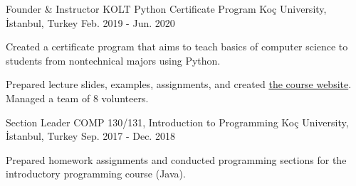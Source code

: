 \begin{cventries}
  \cventry
    {Founder \& Instructor}
    {KOLT Python Certificate Program}
    {Koç University, İstanbul, Turkey}
    {Feb. 2019 - Jun. 2020}
    {
      \begin{cvitems} 
        \item {Created a certificate program that aims to teach basics of computer science to students from nontechnical majors using Python.}
        \item {Prepared lecture slides, examples, assignments, and created \href{https://koltpython.github.io}{the course website}. Managed a team of 8 volunteers.}
      \end{cvitems}
    }


    \cventry
    {Section Leader}%
    {COMP 130/131, Introduction to Programming}%
    {Koç University, İstanbul, Turkey}
    {Sep. 2017 - Dec. 2018}
    {
      \begin{cvitems}
        \item {Prepared homework assignments and conducted programming sections for the introductory programming course (Java).}
      \end{cvitems}
    }


\end{cventries}
